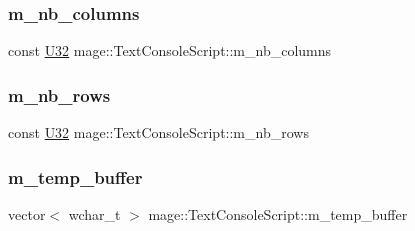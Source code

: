 \hypertarget{classmage_1_1_text_console_script_a3ca01f143dd099ddddb473e47456a7d8}{}\label{classmage_1_1_text_console_script_a3ca01f143dd099ddddb473e47456a7d8} 
\subsubsection{\texorpdfstring{m\+\_\+nb\+\_\+columns}{m\_nb\_columns}}
{\footnotesize\ttfamily const \hyperlink{namespacemage_a41c104c036fba3756a74e19f793eeaa1}{U32} mage\+::\+Text\+Console\+Script\+::m\+\_\+nb\+\_\+columns\hspace{0.3cm}{\ttfamily [private]}}

\hypertarget{classmage_1_1_text_console_script_a2d7c8ac463c2c40da2203e395461b800}{}\label{classmage_1_1_text_console_script_a2d7c8ac463c2c40da2203e395461b800} 
\subsubsection{\texorpdfstring{m\+\_\+nb\+\_\+rows}{m\_nb\_rows}}
{\footnotesize\ttfamily const \hyperlink{namespacemage_a41c104c036fba3756a74e19f793eeaa1}{U32} mage\+::\+Text\+Console\+Script\+::m\+\_\+nb\+\_\+rows\hspace{0.3cm}{\ttfamily [private]}}

\hypertarget{classmage_1_1_text_console_script_a6500bfd006f5c90d05f3da7f3e8e75a8}{}\label{classmage_1_1_text_console_script_a6500bfd006f5c90d05f3da7f3e8e75a8} 
\subsubsection{\texorpdfstring{m\+\_\+temp\+\_\+buffer}{m\_temp\_buffer}}
{\footnotesize\ttfamily vector$<$ wchar\+\_\+t $>$ mage\+::\+Text\+Console\+Script\+::m\+\_\+temp\+\_\+buffer\hspace{0.3cm}{\ttfamily [private]}}

